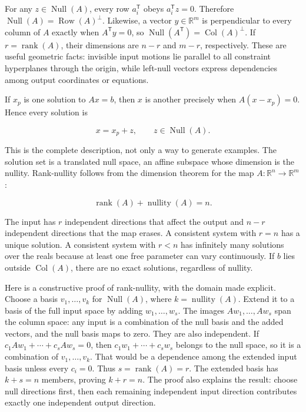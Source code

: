 For any \(z\in\operatorname{Null}(A)\), every row \(a_i^\mathsf T\) obeys \(a_i^\mathsf Tz=0\). Therefore \(\operatorname{Null}(A)=\operatorname{Row}(A)^\perp\). Likewise, a vector \(y\in\mathbb R^m\) is perpendicular to every column of \(A\) exactly when \(A^\mathsf Ty=0\), so \(\operatorname{Null}(A^\mathsf T)=\operatorname{Col}(A)^\perp\). If \(r=\operatorname{rank}(A)\), their dimensions are \(n-r\) and \(m-r\), respectively. These are useful geometric facts: invisible input motions lie parallel to all constraint hyperplanes through the origin, while left-null vectors express dependencies among output coordinates or equations.

If \(x_p\) is one solution to \(Ax=b\), then \(x\) is another precisely when \(A(x-x_p)=0\). Hence every solution is

\[
x=x_p+z,\qquad z\in\operatorname{Null}(A).
\]

This is the complete description, not only a way to generate examples. The solution set is a translated null space, an affine subspace whose dimension is the nullity. Rank-nullity follows from the dimension theorem for the map \(A:\mathbb R^n\to\mathbb R^m\):

\[
\operatorname{rank}(A)+\operatorname{nullity}(A)=n.
\]

The input has \(r\) independent directions that affect the output and \(n-r\) independent directions that the map erases. A consistent system with \(r=n\) has a unique solution. A consistent system with \(r<n\) has infinitely many solutions over the reals because at least one free parameter can vary continuously. If \(b\) lies outside \(\operatorname{Col}(A)\), there are no exact solutions, regardless of nullity.

Here is a constructive proof of rank-nullity, with the domain made explicit. Choose a basis \(v_1,\ldots,v_k\) for \(\operatorname{Null}(A)\), where \(k=\operatorname{nullity}(A)\). Extend it to a basis of the full input space by adding \(w_1,\ldots,w_s\). The images \(Aw_1,\ldots,Aw_s\) span the column space: any input is a combination of the null basis and the added vectors, and the null basis maps to zero. They are also independent. If \(c_1Aw_1+\cdots+c_sAw_s=0\), then \(c_1w_1+\cdots+c_sw_s\) belongs to the null space, so it is a combination of \(v_1,\ldots,v_k\). That would be a dependence among the extended input basis unless every \(c_i=0\). Thus \(s=\operatorname{rank}(A)=r\). The extended basis has \(k+s=n\) members, proving \(k+r=n\). The proof also explains the result: choose null directions first, then each remaining independent input direction contributes exactly one independent output direction.

